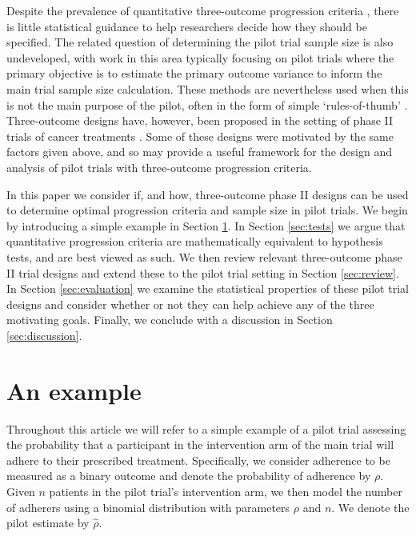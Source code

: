 \documentclass[referee, lineno, pdflatex,sn-vancouver,Numbered]{sn-jnl}%
\theoremstyle{thmstyleone}%
\theoremstyle{thmstyletwo}%
\theoremstyle{thmstylethree}%
\begin{document}
Despite the prevalence of quantitative three-outcome progression criteria \cite{Herbert2019}, there is little statistical guidance to help researchers decide how they should be specified. The related question of determining the pilot trial sample size is also undeveloped, with work in this area typically focusing on pilot trials where the primary objective is to estimate the primary outcome variance to inform the main trial sample size calculation. These methods are nevertheless used when this is not the main purpose of the pilot, often in the form of simple `rules-of-thumb' \cite{Browne1995, Teare2014, Whitehead2015}. Three-outcome designs have, however, been proposed in the setting of phase II trials of cancer treatments \cite{Kirby2016}. Some of these designs were motivated by the same factors given above, and so may provide a useful framework for the design and analysis of pilot trials with three-outcome progression criteria.

In this paper we consider if, and how, three-outcome phase II designs can be used to determine optimal progression criteria and sample size in pilot trials. We begin by introducing a simple example in Section \ref{sec:example}. In Section \ref{sec:tests} we argue that quantitative progression criteria are mathematically equivalent to hypothesis tests, and are best viewed as such. We then review relevant three-outcome phase II trial designs and extend these to the pilot trial setting in Section \ref{sec:review}. In Section \ref{sec:evaluation} we examine the statistical properties of these pilot trial designs and consider whether or not they can help achieve any of the three motivating goals. Finally, we conclude with a discussion in Section \ref{sec:discussion}.

\section{An example}\label{sec:example}

Throughout this article we will refer to a simple example of a pilot trial assessing the probability that a participant in the intervention arm of the main trial will adhere to their prescribed treatment. Specifically, we consider adherence to be measured as a binary outcome and denote the probability of adherence by $\rho$. Given  $n$ patients in the pilot trial's intervention arm, we then model the number of adherers using a binomial distribution with parameters $\rho$ and $n$. We denote the pilot estimate by $\hat{\rho}$.
\end{document}
